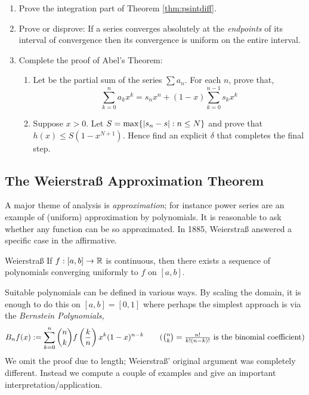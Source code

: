 \begin{exercises}
\begin{enumerate}
	\item\label{ex:psintegralproof} Prove the integration part of Theorem \ref{thm:psintdiff}.
	
	\item Prove or disprove: If a series converges absolutely at the \emph{endpoints} of its interval of convergence then its convergence is uniform on the entire interval.
 
 	\item Complete the proof of Abel's Theorem:
 	\begin{enumerate}
   	\item Let  be the partial sum of the series $\sum a_n$. For each $n$, prove that,
   	\[\sum_{k=0}^na_kx^k =s_nx^n+(1-x)\sum_{k=0}^{n-1}s_kx^k\]
   	\item Suppose $x>0$. Let $S=\max\{\left| s_n-s\right|:n\le N\}$ and prove that $h(x)\le S(1-x^{N+1})$. Hence find an explicit $\delta$ that completes the final step.
	\end{enumerate}
	
	
\end{enumerate}
\end{exercises}

\clearpage

\subsection{The Weierstraß Approximation Theorem}

A major theme of analysis is \emph{approximation}; for instance power series are an example of (uniform) approximation by polynomials. It is reasonable to ask whether any function can be so approximated. In 1885, Weierstraß answered a specific case in the affirmative.


\begin{thm}{Weierstraß}{}
If $f:[a,b]\to\mathbb{R}$ is continuous, then there exists a sequence of polynomials converging uniformly to $f$ on $[a,b]$.
\end{thm}

Suitable polynomials can be defined in various ways. By scaling the domain, it is enough to do this on $[a,b]=[0,1]$ where perhaps the simplest approach is via the \emph{Bernstein Polynomials,}
\[B_nf(x):=\sum_{k=0}^n \binom nkf\left(\frac kn\right) x^k(1-x)^{n-k} \tag{$\binom nk=\frac{n!}{k!(n-k)!}$ is the binomial coefficient}\]
 We omit the proof due to length; Weierstraß' original argument was completely different. Instead we compute a couple of examples and give an important interpretation/application.


